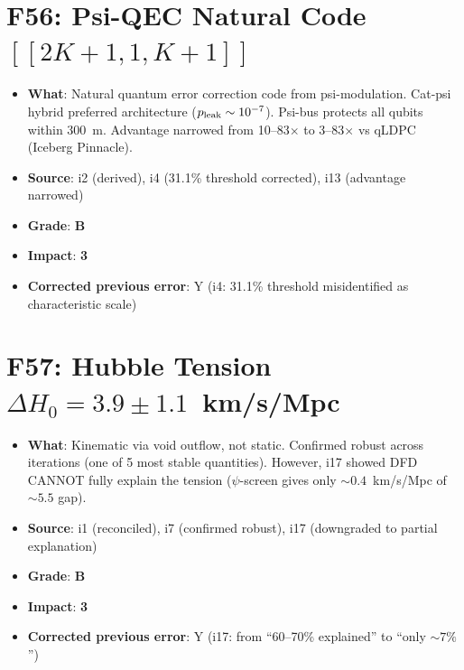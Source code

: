 \documentclass[11pt,a4paper]{article}
\newcommand{\grade}[1]{\textbf{#1}}
\newcommand{\impact}[1]{\textbf{#1}}
\begin{document}
\section{F56: Psi-QEC Natural Code $[[2K+1,1,K+1]]$}
\begin{itemize}[nosep]
\item \textbf{What}: Natural quantum error correction code from psi-modulation. Cat-psi hybrid preferred architecture ($p_{\rm leak} \sim 10^{-7}$). Psi-bus protects all qubits within 300~m. Advantage narrowed from 10--83$\times$ to 3--83$\times$ vs qLDPC (Iceberg Pinnacle).
\item \textbf{Source}: i2 (derived), i4 (31.1\% threshold corrected), i13 (advantage narrowed)
\item \textbf{Grade}: \grade{B}
\item \textbf{Impact}: \impact{3}
\item \textbf{Corrected previous error}: Y (i4: 31.1\% threshold misidentified as characteristic scale)
\end{itemize}

\section{F57: Hubble Tension $\Delta H_0 = 3.9 \pm 1.1$~km/s/Mpc}
\begin{itemize}[nosep]
\item \textbf{What}: Kinematic via void outflow, not static. Confirmed robust across iterations (one of 5 most stable quantities). However, i17 showed DFD CANNOT fully explain the tension ($\psi$-screen gives only $\sim 0.4$~km/s/Mpc of $\sim 5.5$ gap).
\item \textbf{Source}: i1 (reconciled), i7 (confirmed robust), i17 (downgraded to partial explanation)
\item \textbf{Grade}: \grade{B}
\item \textbf{Impact}: \impact{3}
\item \textbf{Corrected previous error}: Y (i17: from ``60--70\% explained'' to ``only $\sim 7\%$'')
\end{itemize}

\end{document}
